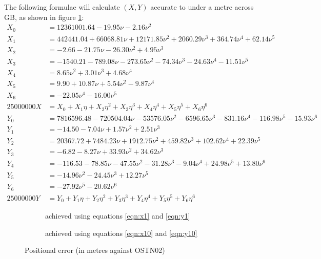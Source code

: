 \documentclass[10pt,a4paper]{article}
\def\tkname#1{}
\def\gap{\hspace{2cm}}
\begin{document}
The following formulae will calculate $(X,Y)$ accurate to under a metre across
GB, as shown in figure \ref{fig:grid_to_wm_1m}:
\begin{align}
X_0 &= 12361001.64 -19.95\nu -2.16\nu^2\nonumber \\
X_1 &= 442441.04 +66068.81\nu +12171.85\nu^2 +2060.29\nu^3 +364.74\nu^4 +62.14\nu^5\nonumber \\
X_2 &= -2.66 -21.75\nu -26.30\nu^2 +4.95\nu^3\nonumber \\
X_3 &= -1540.21 -789.08\nu -273.65\nu^2 -74.34\nu^3 -24.63\nu^4 -11.51\nu^5\nonumber \\
X_4 &= 8.65\nu^2 +3.01\nu^3 +4.68\nu^4\nonumber \\
X_5 &= 9.90 +10.87\nu +5.54\nu^2 -9.87\nu^4\nonumber \\
X_6 &= -22.05\nu^4 -16.00\nu^5\nonumber \\
25000000 X &= X_0 +X_1\eta +X_2\eta^2 +X_3\eta^3 +X_4\eta^4 +X_5\eta^5 +X_6\eta^6
  \label{eqn:x1}
\\[1ex]
Y_0 &= 7816596.48 -720504.04\nu -53576.05\nu^2 -6596.65\nu^3 -831.16\nu^4 -116.98\nu^5 -15.93\nu^6\nonumber \\
Y_1 &= -14.50 -7.04\nu +1.57\nu^2 +2.51\nu^3\nonumber \\
Y_2 &= 20367.72 +7484.23\nu +1912.75\nu^2 +459.82\nu^3 +102.62\nu^4 +22.39\nu^5\nonumber \\
Y_3 &= -6.82 -8.27\nu +33.93\nu^2 +34.62\nu^3\nonumber \\
Y_4 &= -116.53 -78.85\nu -47.55\nu^2 -31.28\nu^3 -9.04\nu^4 +24.98\nu^5 +13.80\nu^6\nonumber \\
Y_5 &= -14.96\nu^2 -24.45\nu^3 +12.27\nu^5\nonumber \\
Y_6 &= -27.92\nu^5 -20.62\nu^6\nonumber \\
25000000 Y &= Y_0 +Y_1\eta +Y_2\eta^2 +Y_3\eta^3 +Y_4\eta^4 +Y_5\eta^5 +Y_6\eta^6
  \label{eqn:y1}
\end{align}

\begin{figure}[htb]
  \begin{subfigure}[b]{0.4\textwidth}
    \tkname{grid_to_wm_1m}
  \centering
  \fbox{
    
  }
  \caption{achieved using equations \eqref{eqn:x1} and \eqref{eqn:y1}}
  \label{fig:grid_to_wm_1m}
\end{subfigure}
\gap
  \begin{subfigure}[b]{0.4\textwidth}
    \tkname{grid_to_wm_10m}
  \centering
  \fbox{
    
  }
  \caption{achieved using equations \eqref{eqn:x10} and \eqref{eqn:y10}}
  \label{fig:grid_to_wm_10m}
\end{subfigure}
  \caption{Positional error (in metres against OSTN02)}
\hrulefill
\end{figure}
\end{document}
